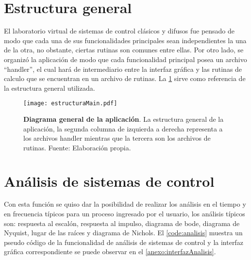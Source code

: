 \section{Estructura general}

    El laboratorio virtual de sistemas de control clásicos y difusos fue pensado de modo que cada una de sus funcionalidades principales sean independientes la una de la otra, no obstante, ciertas rutinas son comunes entre ellas. Por otro lado, se organizó la aplicación de modo que cada funcionalidad principal posea un archivo \enquote{handler}, el cual hará de intermediario entre la interfaz gráfica y las rutinas de calculo que se encuentran en un archivo de rutinas. La \cref{fig:estructuraMain} sirve como referencia de la estructura general utilizada.

    \begin{figure}[htb]
        \centering
        \texttt{[image: estructuraMain.pdf]}
        \caption[Diagrama general de la aplicación]{\textbf{Diagrama general de la aplicación}. La estructura general de la aplicación, la segunda columna de izquierda a derecha representa a los archivos handler mientras que la tercera son los archivos de rutinas. Fuente: Elaboración propia.} 
        \label{fig:estructuraMain}
    \end{figure}

\section{Análisis de sistemas de control}
    
    Con esta función se quiso dar la posibilidad de realizar los análisis en el tiempo y en frecuencia típicos para un proceso ingresado por el usuario, los análisis típicos son: respuesta al escalón, respuesta al impulso, diagrama de bode, diagrama de Nyquist, lugar de las raíces y diagrama de Nichols. El \cref{code:analisis} muestra un pseudo código de la funcionalidad de análisis de sistemas de control y la interfaz gráfica correspondiente se puede observar en el \ref{anexo:interfazAnalisis}.

